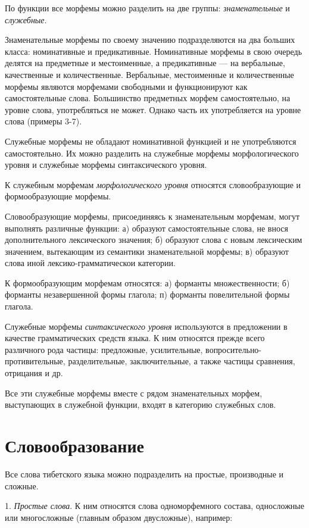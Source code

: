 По функции все морфемы можно разделить на две группы: \emph{знаменательные} и \emph{служебные}.

Знаменательные морфемы по своему значению подразделяются на два больших класса: номинативные и предикативные. Номинативные морфемы в свою очередь делятся на предметные и местоименные, а предикативные --- на вербальные, качественные и количественные. Вербальные, местоименные и количественные морфемы являются морфемами свободными и функционируют как самостоятельные слова. Большинство предметных морфем самостоятельно, на уровне слова, употребляться не может. Однако часть их употребляется на уровне слова (примеры 3-7).

Служебные морфемы не обладают номинативной функцией и не употребляются самостоятельно. Их можно разделить на служебные морфемы морфологического уровня и служебные морфемы синтаксического уровня.

К служебным морфемам \emph{морфологического уровня} относятся словообразующие и формообразующие морфемы.

Словообразующие морфемы, присоединяясь к знаменательным морфемам, могут выполнять различные функции: а) образуют самостоятельные слова, не внося дополнительного лексического значения; б) образуют слова с новым лексическим значением, вытекающим из семантики знаменательной морфемы; в) образуют слова иной лексико-грамматическои категории.

К формообразующим морфемам относятся: а) форманты множественности; б) форманты незавершенной формы глагола; п) форманты повелительной формы глагола.

Служебные морфемы \emph{синтаксического уровня} используются в предложении в качестве грамматических средств языка. К ним относятся прежде всего различного рода частицы: предложные, усилительные, вопросительно-противительные, разделительные, заключительные, а также частицы сравнения, отрицания и др.

Все эти служебные морфемы вместе с рядом знаменательных морфем, выступающих в служебной функции, входят в категорию служебных слов.

\section{Словообразование}

Все слова тибетского языка можно подразделить на простые, производные и сложные.

1. \emph{Простые слова}. К ним относятся слова одноморфемного состава, односложные или многосложные (главным образом двусложные), например:

